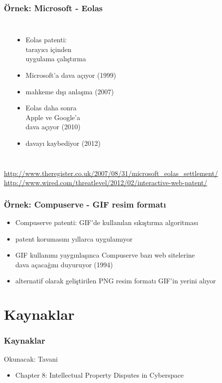 \documentclass[dvipsnames]{beamer}
\theoremstyle{plain}
\begin{document}

\begin{frame}
  \frametitle{Örnek: Microsoft - Eolas}

  \begin{columns}
    \begin{center}
    \end{center}

    \begin{itemize}
      \item Eolas patenti:\\
        tarayıcı içinden\\
        uygulama çalıştırma
      \item Microsoft'a dava açıyor (1999)
      \item mahkeme dışı anlaşma (2007)

      \pause
      \medskip
      \item Eolas daha sonra\\
        Apple ve Google'a\\
        dava açıyor (2010)
      \item davayı kaybediyor (2012)
    \end{itemize}
  \end{columns}

  \medskip
  \tiny{\url{http://www.theregister.co.uk/2007/08/31/microsoft_eolas_settlement/}}\\
  \tiny{\url{http://www.wired.com/threatlevel/2012/02/interactive-web-patent/}}\\
\end{frame}

\begin{frame}
  \frametitle{Örnek: Compuserve - GIF resim formatı}

  \begin{itemize}
    \item Compuserve patenti: GIF'de kullanılan sıkıştırma algoritması
    \item patent korumasını yıllarca uygulamıyor
    \item GIF kullanımı yaygınlaşınca Compuserve bazı web sitelerine\\
      dava açacağını duyuruyor (1994)

    \pause
    \medskip
    \item alternatif olarak geliştirilen PNG resim formatı GIF'in yerini alıyor
  \end{itemize}
\end{frame}

\section*{Kaynaklar}

\begin{frame}
  \frametitle{Kaynaklar}

  \begin{block}{Okunacak: Tavani}
    \begin{itemize}
      \item Chapter 8: \alert{Intellectual Property Disputes in Cyberspace}
    \end{itemize}
  \end{block}
\end{frame}
\end{document}
